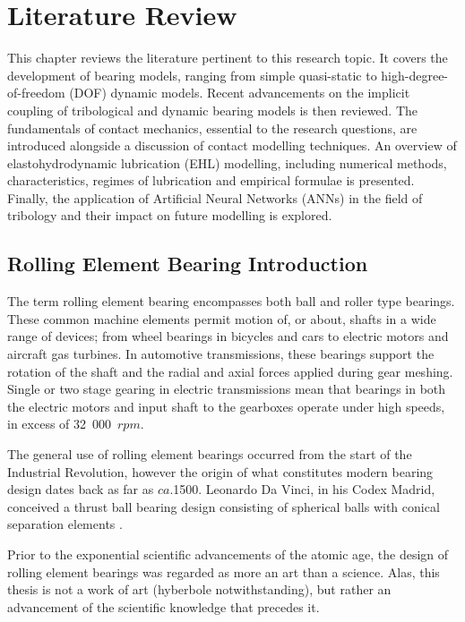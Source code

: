 \chapter{Literature Review}
\label{Literature Review}

This chapter reviews the literature pertinent to this research topic. It covers the development of bearing models, ranging from simple quasi-static to high-degree-of-freedom (DOF) dynamic models. Recent advancements on the implicit coupling of tribological and dynamic bearing models is then reviewed. The fundamentals of contact mechanics, essential to the research questions, are introduced alongside a discussion of contact modelling techniques. An overview of elastohydrodynamic lubrication (EHL) modelling, including numerical methods, characteristics, regimes of lubrication and empirical formulae is presented. Finally, the application of Artificial Neural Networks (ANNs) in the field of tribology and their impact on future modelling is explored.

\section{Rolling Element Bearing Introduction}

The term rolling element bearing encompasses both ball and roller type bearings. These common machine elements permit motion of, or about, shafts in a wide range of devices; from wheel bearings in bicycles and cars to electric motors and aircraft gas turbines. In automotive transmissions, these bearings support the rotation of the shaft and the radial and axial forces applied during gear meshing. Single or two stage gearing in electric transmissions mean that bearings in both the electric motors and input shaft to the gearboxes operate under high speeds, in excess of 32~000~$rpm$.

The general use of rolling element bearings occurred from the start of the Industrial Revolution, however the origin of what constitutes modern bearing design dates back as far as $ca.$1500. Leonardo Da Vinci, in his Codex Madrid, conceived a thrust ball bearing design consisting of spherical balls with conical separation elements \cite{Harris2007}.

Prior to the exponential scientific advancements of the atomic age, the design of rolling element bearings was regarded as more an art than a science. Alas, this thesis is not a work of art (hyberbole notwithstanding), but rather an advancement of the scientific knowledge that precedes it.

